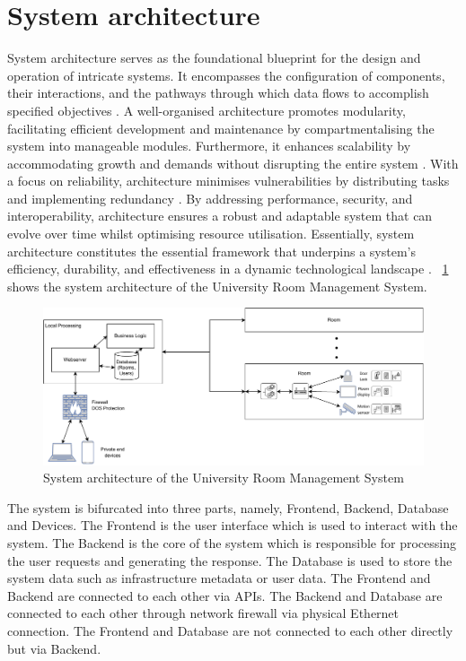 \documentclass[conference,onecolumn]{IEEEtran}
\begin{document}
\section{System architecture}
	System architecture serves as the foundational blueprint for the design and operation of intricate systems. It encompasses the configuration of components, their interactions, and the pathways through which data flows to accomplish specified objectives \cite{steen2007distributed}. A well-organised architecture promotes modularity, facilitating efficient development and maintenance by compartmentalising the system into manageable modules. Furthermore, it enhances scalability by accommodating growth and demands without disrupting the entire system \cite{kotseruba2016review}. With a focus on reliability, architecture minimises vulnerabilities by distributing tasks and implementing redundancy \cite{steen2007distributed}. By addressing performance, security, and interoperability, architecture ensures a robust and adaptable system that can evolve over time whilst optimising resource utilisation. Essentially, system architecture constitutes the essential framework that underpins a system's efficiency, durability, and effectiveness in a dynamic technological landscape \cite{kotseruba2016review}. \figurename~\ref{fig:systemarchitecture} shows the system architecture of the University Room Management System.


	\begin{figure}[H]
		\centering
		\includegraphics[width=1\textwidth]{Figures/SystemArchitecture.pdf}
		\caption{System architecture of the University Room Management System}
		\label{fig:systemarchitecture}
	\end{figure}

	The system is bifurcated into three parts, namely, Frontend, Backend, Database and Devices. The Frontend is the user interface which is used to interact with the system. The Backend is the core of the system which is responsible for processing the user requests and generating the response. The Database is used to store the system data such as infrastructure metadata or user data. The Frontend and Backend are connected to each other via APIs. The Backend and Database are connected to each other through network firewall via physical Ethernet connection. The Frontend and Database are not connected to each other directly but via Backend. 
\end{document}
